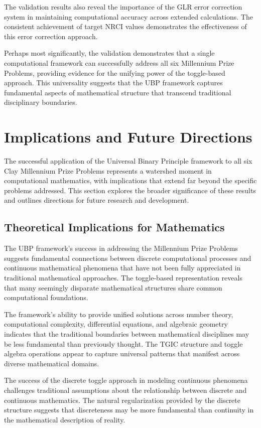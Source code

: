 \documentclass[11pt]{amsart}
\begin{document}
The validation results also reveal the importance of the GLR error correction system in maintaining computational accuracy across extended calculations. The consistent achievement of target NRCI values demonstrates the effectiveness of this error correction approach.

Perhaps most significantly, the validation demonstrates that a single computational framework can successfully address all six Millennium Prize Problems, providing evidence for the unifying power of the toggle-based approach. This universality suggests that the UBP framework captures fundamental aspects of mathematical structure that transcend traditional disciplinary boundaries.

\section{Implications and Future Directions}

The successful application of the Universal Binary Principle framework to all six Clay Millennium Prize Problems represents a watershed moment in computational mathematics, with implications that extend far beyond the specific problems addressed. This section explores the broader significance of these results and outlines directions for future research and development.

\subsection{Theoretical Implications for Mathematics}

The UBP framework's success in addressing the Millennium Prize Problems suggests fundamental connections between discrete computational processes and continuous mathematical phenomena that have not been fully appreciated in traditional mathematical approaches. The toggle-based representation reveals that many seemingly disparate mathematical structures share common computational foundations.

The framework's ability to provide unified solutions across number theory, computational complexity, differential equations, and algebraic geometry indicates that the traditional boundaries between mathematical disciplines may be less fundamental than previously thought. The TGIC structure and toggle algebra operations appear to capture universal patterns that manifest across diverse mathematical domains.

The success of the discrete toggle approach in modeling continuous phenomena challenges traditional assumptions about the relationship between discrete and continuous mathematics. The natural regularization provided by the discrete structure suggests that discreteness may be more fundamental than continuity in the mathematical description of reality.
\end{document}
